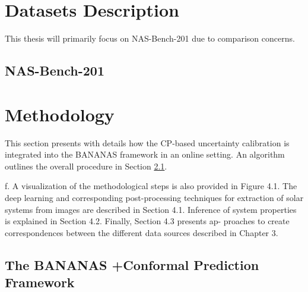 \documentclass[a4paper,oneside,bibliography=totoc]{scrbook}
\begin{document}
\chapter{Datasets Description}
\label{Dataset}

This thesis will primarily focus on NAS-Bench-201 due to comparison concerns.
\section{NAS-Bench-201}


\chapter{Methodology}
This section presents with details how the CP-based uncertainty calibration is integrated into the BANANAS framework in an online setting. An algorithm outlines the overall procedure in Section \ref{sec:overview}. 
 

f. A visualization of the methodological steps is also provided in Figure 4.1. The deep learning and corresponding post-processing techniques for extraction of solar systems from images are described in Section 4.1. Inference of system properties is explained in Section 4.2. Finally, Section 4.3 presents ap- proaches to create correspondences between the different data sources described in Chapter 3.

\section{The BANANAS +Conformal Prediction Framework}
\label{sec:overview}
\end{document}
